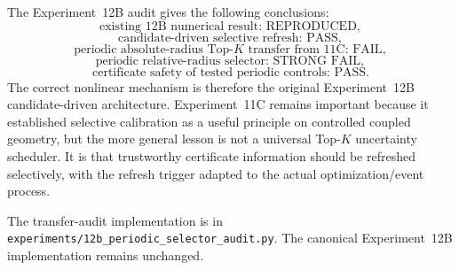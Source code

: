The Experiment~12B audit gives the following conclusions:
\begin{equation}
  \boxed{\text{existing 12B numerical result: REPRODUCED}},
\end{equation}
\begin{equation}
  \boxed{\text{candidate-driven selective refresh: PASS}},
\end{equation}
\begin{equation}
  \boxed{\text{periodic absolute-radius Top-$K$ transfer from 11C: FAIL}},
\end{equation}
\begin{equation}
  \boxed{\text{periodic relative-radius selector: STRONG FAIL}},
\end{equation}
\begin{equation}
  \boxed{\text{certificate safety of tested periodic controls: PASS}}.
\end{equation}
The correct nonlinear mechanism is therefore the original Experiment~12B candidate-driven architecture. Experiment~11C remains important because it established selective calibration as a useful principle on controlled coupled geometry, but the more general lesson is not a universal Top-$K$ uncertainty scheduler. It is that trustworthy certificate information should be refreshed selectively, with the refresh trigger adapted to the actual optimization/event process.

The transfer-audit implementation is in \texttt{experiments/12b\_periodic\_selector\_audit.py}. The canonical Experiment~12B implementation remains unchanged.
